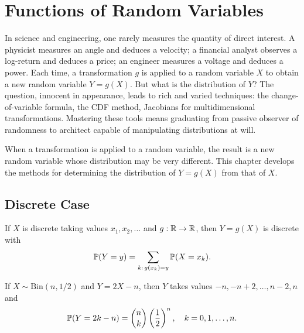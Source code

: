 \chapter{Functions of Random Variables}
\label{ch:functions_rv}

In science and engineering, one rarely measures the quantity of direct interest. A physicist measures an angle and deduces a velocity; a financial analyst observes a log-return and deduces a price; an engineer measures a voltage and deduces a power. Each time, a transformation $g$ is applied to a random variable $X$ to obtain a new random variable $Y = g(X)$. But what is the distribution of $Y$? The question, innocent in appearance, leads to rich and varied techniques: the change-of-variable formula, the CDF method, Jacobians for multidimensional transformations. Mastering these tools means graduating from passive observer of randomness to architect capable of manipulating distributions at will.

\begin{intuition}
When a transformation is applied to a random variable, the result is a new random
variable whose distribution may be very different. This chapter develops the methods
for determining the distribution of $Y = g(X)$ from that of $X$.
\end{intuition}

\section{Discrete Case}

\begin{proposition}
If $X$ is discrete taking values $x_1, x_2, \ldots$ and $g : \mathbb{R} \to \mathbb{R}$, then
$Y = g(X)$ is discrete with
\[
    \mathbb{P}(Y = y) = \sum_{k:\, g(x_k)=y} \mathbb{P}(X = x_k).
\]
\end{proposition}

\begin{example}
If $X \sim \mathrm{Bin}(n, 1/2)$ and $Y = 2X - n$, then $Y$ takes values
$-n, -n+2, \ldots, n-2, n$ and
\[
    \mathbb{P}(Y = 2k-n) = \binom{n}{k}\left(\frac{1}{2}\right)^n, \quad k = 0, 1, \ldots, n.
\]
\end{example}

